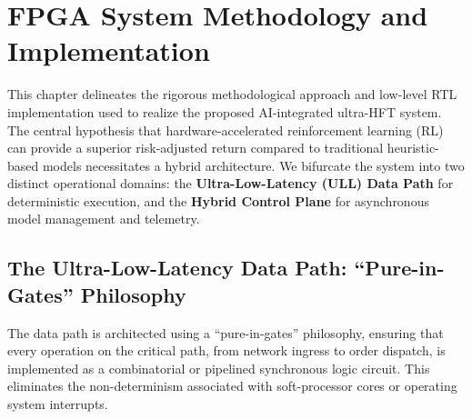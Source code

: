 \chapter{FPGA System Methodology and Implementation}
\label{ch:fpga_implementation}

This chapter delineates the rigorous methodological approach and low-level RTL implementation used to realize the proposed AI-integrated ultra-HFT system. The central hypothesis that hardware-accelerated reinforcement learning (RL) can provide a superior risk-adjusted return compared to traditional heuristic-based models necessitates a hybrid architecture. We bifurcate the system into two distinct operational domains: the \textbf{Ultra-Low-Latency (ULL) Data Path} for deterministic execution, and the \textbf{Hybrid Control Plane} for asynchronous model management and telemetry.

\section{The Ultra-Low-Latency Data Path: ``Pure-in-Gates'' Philosophy}
The data path is architected using a ``pure-in-gates'' philosophy, ensuring that every operation on the critical path, from network ingress to order dispatch, is implemented as a combinatorial or pipelined synchronous logic circuit. This eliminates the non-determinism associated with soft-processor cores or operating system interrupts.

